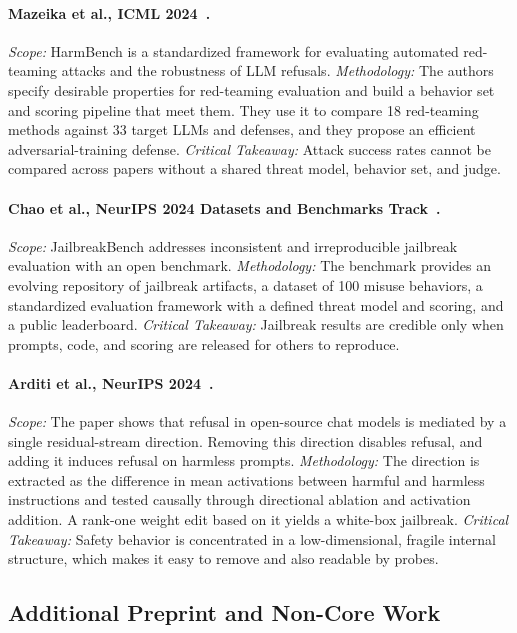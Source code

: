 \documentclass[sigconf]{acmart}
\begin{document}
\paragraph{Mazeika et al., ICML 2024~\cite{mazeika2024harmbench}.}
\emph{Scope:} HarmBench is a standardized framework for evaluating automated red-teaming attacks and the robustness of LLM refusals.
\emph{Methodology:} The authors specify desirable properties for red-teaming evaluation and build a behavior set and scoring pipeline that meet them. They use it to compare 18 red-teaming methods against 33 target LLMs and defenses, and they propose an efficient adversarial-training defense.
\emph{Critical Takeaway:} Attack success rates cannot be compared across papers without a shared threat model, behavior set, and judge.

\paragraph{Chao et al., NeurIPS 2024 Datasets and Benchmarks Track~\cite{chao2024jailbreakbench}.}
\emph{Scope:} JailbreakBench addresses inconsistent and irreproducible jailbreak evaluation with an open benchmark.
\emph{Methodology:} The benchmark provides an evolving repository of jailbreak artifacts, a dataset of 100 misuse behaviors, a standardized evaluation framework with a defined threat model and scoring, and a public leaderboard.
\emph{Critical Takeaway:} Jailbreak results are credible only when prompts, code, and scoring are released for others to reproduce.

\paragraph{Arditi et al., NeurIPS 2024~\cite{arditi2024refusal}.}
\emph{Scope:} The paper shows that refusal in open-source chat models is mediated by a single residual-stream direction. Removing this direction disables refusal, and adding it induces refusal on harmless prompts.
\emph{Methodology:} The direction is extracted as the difference in mean activations between harmful and harmless instructions and tested causally through directional ablation and activation addition. A rank-one weight edit based on it yields a white-box jailbreak.
\emph{Critical Takeaway:} Safety behavior is concentrated in a low-dimensional, fragile internal structure, which makes it easy to remove and also readable by probes.

\subsection{Additional Preprint and Non-Core Work}
\label{sec:rw-noncore}
\end{document}
